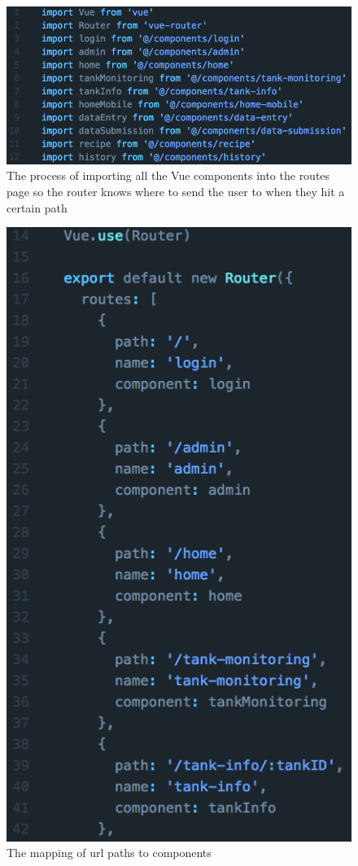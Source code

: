 \documentclass[draftclsnofoot,onecolumn,letterpaper,10pt]{IEEEtran}
\begin{document}
\begin{figure}[H]
	\centering
	\includegraphics[scale=.3]{./code/routes_imports.png}
	\caption{The process of importing all the Vue components into the routes page so the router knows where to send the user to when they hit a certain path}
\end{figure}

\begin{figure}[H]
	\centering
	\includegraphics[scale=.3]{./code/routes.png}
	\caption{The mapping of url paths to components}
\end{figure}
\end{document}
